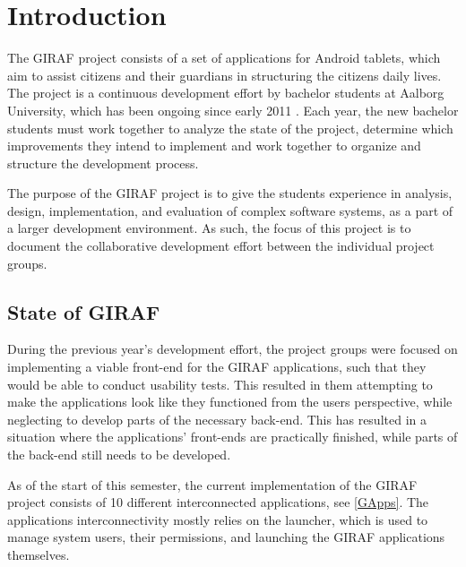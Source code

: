\chapter{Introduction}
The GIRAF project consists of a set of applications for Android
tablets, which aim to assist citizens and their guardians in 
structuring the citizens daily lives. The project is a continuous development
effort by bachelor students at Aalborg University, which has been
ongoing since early 2011 \citep{GIRAF2011}. Each year, the new bachelor students
must work together to analyze the state of the project, determine which improvements
they intend to implement and work together to organize and structure the
development process.\nl

The purpose of the GIRAF project is to give the students experience in analysis,
design, implementation, and evaluation of complex software systems, as a part of
a larger development environment. As such, the focus of this project is to
document the collaborative development effort between the individual project
groups.


\section{State of GIRAF}
During the previous year's development effort, the project groups were focused
on implementing a viable front-end for the GIRAF applications, such that they
would be able to conduct usability tests. This resulted in them
attempting to make the applications look like they functioned from the users
perspective, while neglecting to develop parts of the necessary back-end.
This has resulted in a situation where the applications' front-ends are
practically finished, while parts of the back-end still needs to be
developed.\nl

As of the start of this semester, the current implementation of the GIRAF
project consists of 10 different interconnected applications, see
\autoref{GApps}. The applications interconnectivity mostly relies on the
launcher, which is used to manage system users, their permissions, and
launching the GIRAF applications themselves.


